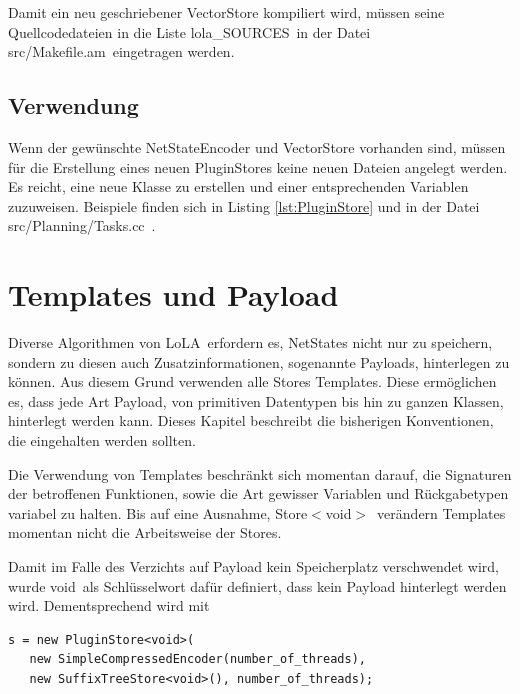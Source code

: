 \documentclass[12pt,a4paper,titlepage]{scrartcl}
\renewcommand \( {\left (}
\renewcommand \) {\right )}
\renewcommand \[ {\left [}
\renewcommand \] {\right ]}
\newcommand \Flqq {\flqq\ }
\newcommand{\lola}{\frqq LoLA\Flqq}
\begin{document}
Damit ein neu geschriebener VectorStore kompiliert wird, müssen seine Quellcodedateien in die Liste \frqq lola\_SOURCES\Flqq in der Datei \frqq src/Makefile.am\Flqq eingetragen werden.

\subsection{Verwendung}
Wenn der gewünschte NetStateEncoder und VectorStore vorhanden sind, müssen für die Erstellung eines neuen PluginStores keine neuen Dateien angelegt werden. Es reicht, eine neue Klasse zu erstellen und einer entsprechenden Variablen zuzuweisen. Beispiele finden sich in Listing \ref{lst:PluginStore} und in der Datei \frqq src/Planning/Tasks.cc\Flqq.

\section{Templates und Payload}
Diverse Algorithmen von \lola erfordern es, NetStates nicht nur zu speichern, sondern zu diesen auch Zusatzinformationen, sogenannte Payloads, hinterlegen zu können. Aus diesem Grund verwenden alle Stores Templates. Diese ermöglichen es, dass jede Art Payload, von primitiven Datentypen bis hin zu ganzen Klassen, hinterlegt werden kann. Dieses Kapitel beschreibt die bisherigen Konventionen, die eingehalten werden sollten.

Die Verwendung von Templates beschränkt sich momentan darauf, die Signaturen der betroffenen Funktionen, sowie die Art gewisser Variablen und Rückgabetypen variabel zu halten. Bis auf eine Ausnahme,
\frqq Store$<$void$>$\Flqq verändern Templates momentan nicht die Arbeitsweise der Stores.

Damit im Falle des Verzichts auf Payload kein Speicherplatz verschwendet wird, wurde \frqq void\Flqq als Schlüsselwort dafür definiert, dass kein Payload hinterlegt werden wird. Dementsprechend wird mit

\begin{center}
\begin{minipage}{0.7\textwidth}
\lstset{language=C++}
\begin{lstlisting}[label=lst:PluginStore,caption={Erstellung eines PluginStores}]
s = new PluginStore<void>(
   new SimpleCompressedEncoder(number_of_threads),
   new SuffixTreeStore<void>(), number_of_threads);\end{lstlisting}
\end{minipage}
\end{center}
\end{document}
